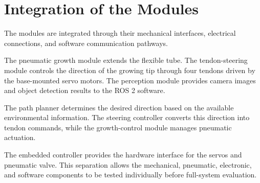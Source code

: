 \section{Integration of the Modules}

The modules are integrated through their mechanical interfaces, electrical connections, and software communication pathways.

The pneumatic growth module extends the flexible tube. The tendon-steering module controls the direction of the growing tip through four tendons driven by the base-mounted servo motors. The perception module provides camera images and object detection results to the ROS 2 software.

The path planner determines the desired direction based on the available environmental information. The steering controller converts this direction into tendon commands, while the growth-control module manages pneumatic actuation.

The embedded controller provides the hardware interface for the servos and pneumatic valve. This separation allows the mechanical, pneumatic, electronic, and software components to be tested individually before full-system evaluation.